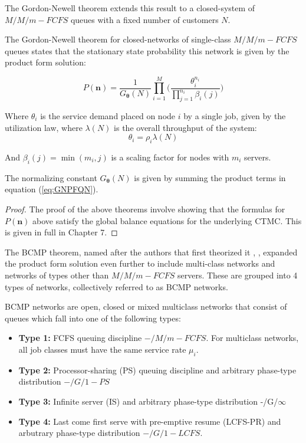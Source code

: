 The Gordon-Newell theorem extends this result to a closed-system of \(M/M/m-FCFS\) queues with a fixed number of customers \(N\).
\begin{theorem}
    The Gordon-Newell theorem for closed-networks of single-class \(M/M/m-FCFS\) queues states that the stationary state probability this network is given by the product form solution:
    
    \begin{equation}\label{eq:GNPFQN}
        P(\mathbf{n}) = \frac{1}{G_{\boldsymbol{\theta}}(N)} \prod_{i=1}^M \bigg( \frac{\theta_i^{n_i}}{\prod_{j=1}^{n_i} \beta_i(j)} \bigg)
    \end{equation}
    
    Where \(\theta_i\) is the service demand placed on node \(i\) by a single job, given by the utilization law, where \(\lambda(N)\) is the overall throughput of the system:
    \begin{equation*}
        \theta_i = \rho_i \lambda(N)
    \end{equation*}
    
    And \(\beta_i(j) = \min(m_i, j)\) is a scaling factor for nodes with \(m_i\) servers.
    
    The normalizing constant \(G_{\boldsymbol{\theta}}(N)\) is given by summing the product terms in equation (\ref{eq:GNPFQN}).
    
\end{theorem}

\begin{proof}
    The proof of the above theorems involve showing that the formulas for \(P(\mathbf{n})\) above satisfy the global balance equations for the underlying CTMC. This is given in full in \cite{Bolch2006QueueingApplications} Chapter 7.
\end{proof}

The BCMP theorem, named after the authors that first theorized it \cite{Baskett1975OpenCustomers}, , expanded the product form solution even further to include multi-class networks and networks of types other than \(M/M/m-FCFS\) servers. These are grouped into 4 types of networks, collectively referred to as BCMP networks.

\begin{definition}
    BCMP networks are open, closed or mixed multiclass networks that consist of queues which fall into one of the following types:
    \begin{itemize}
        \item \textbf{Type 1:} FCFS queuing discipline \(-/M/m-FCFS\). For multiclass networks, all job classes must have the same service rate \(\mu_i\).
        \item \textbf{Type 2:} Processor-sharing (PS) queuing discipline and arbitrary phase-type distribution \(-/G/1-PS\)
        \item \textbf{Type 3:} Infinite server (IS) and arbitrary phase-type distribution -/G/\(\infty\)
        \item \textbf{Type 4:} Last come first serve with pre-emptive resume (LCFS-PR) and arbutrary phase-type distribution \(-/G/1-LCFS\).
    \end{itemize}
\end{definition}

